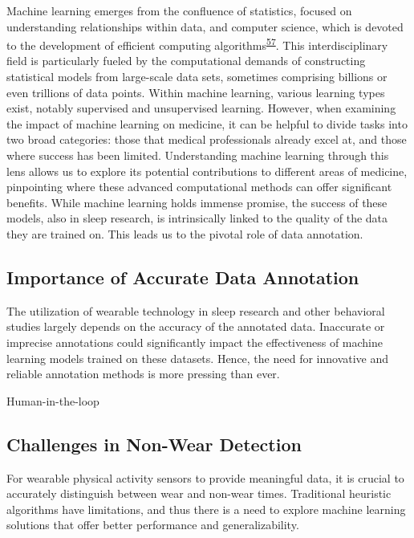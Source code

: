 \documentclass[
  9pt,
]{scrbook}
\begin{document}
Machine learning emerges from the confluence of statistics, focused on
understanding relationships within data, and computer science, which is
devoted to the development of efficient computing
algorithms\textsuperscript{\protect\hyperlink{ref-hastie01statisticallearning}{57}}.
This interdisciplinary field is particularly fueled by the computational
demands of constructing statistical models from large-scale data sets,
sometimes comprising billions or even trillions of data points. Within
machine learning, various learning types exist, notably supervised and
unsupervised learning. However, when examining the impact of machine
learning on medicine, it can be helpful to divide tasks into two broad
categories: those that medical professionals already excel at, and those
where success has been limited. Understanding machine learning through
this lens allows us to explore its potential contributions to different
areas of medicine, pinpointing where these advanced computational
methods can offer significant benefits. While machine learning holds
immense promise, the success of these models, also in sleep research, is
intrinsically linked to the quality of the data they are trained on.
This leads us to the pivotal role of data annotation.

\hypertarget{importance-of-accurate-data-annotation}{%
\subsection{Importance of Accurate Data
Annotation}\label{importance-of-accurate-data-annotation}}

The utilization of wearable technology in sleep research and other
behavioral studies largely depends on the accuracy of the annotated
data. Inaccurate or imprecise annotations could significantly impact the
effectiveness of machine learning models trained on these datasets.
Hence, the need for innovative and reliable annotation methods is more
pressing than ever.

Human-in-the-loop

\hypertarget{challenges-in-non-wear-detection}{%
\subsection{Challenges in Non-Wear
Detection}\label{challenges-in-non-wear-detection}}

For wearable physical activity sensors to provide meaningful data, it is
crucial to accurately distinguish between wear and non-wear times.
Traditional heuristic algorithms have limitations, and thus there is a
need to explore machine learning solutions that offer better performance
and generalizability.
\end{document}
